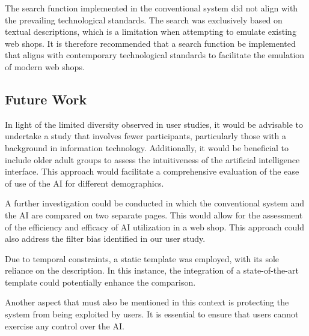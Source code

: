 \documentclass[../../submission.tex]{subfiles}
\begin{document}
The search function implemented in the conventional system did not align with the prevailing 
technological standards. The search was exclusively based on textual descriptions, which is a limitation when attempting to emulate
existing web shops. It is therefore recommended that a search function be implemented that aligns with contemporary technological 
standards to facilitate the emulation of modern web shops.

\subsection{Future Work}
In light of the limited diversity observed in user studies, it would be advisable to undertake a study that involves fewer participants, 
particularly those with a background in information technology. Additionally, it would be beneficial to include older adult groups to 
assess the intuitiveness of the artificial intelligence interface. This approach would facilitate a comprehensive evaluation of the ease 
of use of the AI for different demographics.

A further investigation could be conducted in which the conventional system and the AI are compared on two separate pages. 
This would allow for the assessment of the efficiency and efficacy of AI utilization in a web shop. This approach could also address 
the filter bias identified in our user study.

Due to temporal constraints, a static template was employed, with its sole reliance on the description. In this instance, 
the integration of a state-of-the-art template could potentially enhance the comparison.

Another aspect that must also be mentioned in this context is protecting the system from being exploited by users. 
It is essential to ensure that users cannot exercise any control over the AI.
\end{document}

